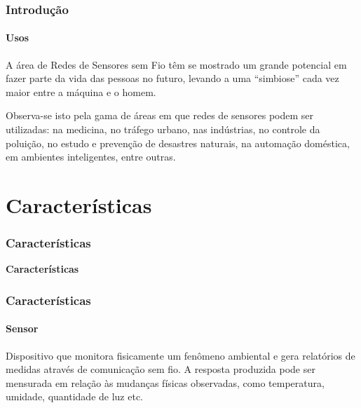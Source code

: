 \documentclass[notes]{beamer}
\begin{document}
\begin{frame}
\frametitle{Introdução}
\framesubtitle{Usos}

\begin{block}

A área de Redes de Sensores sem Fio têm se mostrado um grande potencial em fazer parte da vida das pessoas no futuro, levando a uma “simbiose” cada vez maior entre a máquina e o homem. 

\end{block} \pause

\begin{block}

Observa-se isto pela gama de áreas em que redes de sensores podem ser utilizadas: na medicina, no tráfego urbano, nas indústrias, no controle da poluição, no estudo e prevenção de desastres naturais, na automação doméstica, em ambientes inteligentes, entre outras. 

\end{block}

\end{frame}

\section{Características}
\begin{frame}
\frametitle{Características}

\begin{block}

 \center \textbf{Características}
 
\end{block}

\end{frame}

\begin{frame}
\frametitle{Características}
\framesubtitle{Sensor}

\begin{block}

Dispositivo que monitora fisicamente um fenômeno ambiental e gera
relatórios de medidas através de comunicação sem
fio. A resposta produzida pode ser mensurada em relação às mudanças físicas observadas, como temperatura, umidade, quantidade de luz etc.
\end{block}

\end{frame}
\end{document}
